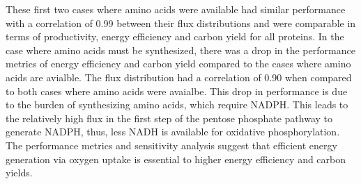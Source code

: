 \documentclass[journal=asbcd6,manuscript=article]{achemso}
\begin{document}
These first two cases where amino acids were available had similar performance with a correlation of 0.99 between their flux distributions and were comparable in terms of productivity, energy efficiency and carbon yield for all proteins.
In the case where amino acids must be synthesized, there was a drop in the performance metrics of energy efficiency and carbon yield compared to the cases where amino acids are avialble.
The flux distribution had a correlation of 0.90 when compared to both cases where amino acids were avaialbe. 
This drop in performance is due to the burden of synthesizing amino acids, which require NADPH.
This leads to the relatively high flux in the first step of the pentose phosphate pathway to generate NADPH, thus, less NADH is available for oxidative phosphorylation.
The performance metrics and sensitivity analysis suggest that efficient energy generation via oxygen uptake is essential to higher energy efficiency and carbon yields.
\end{document}
